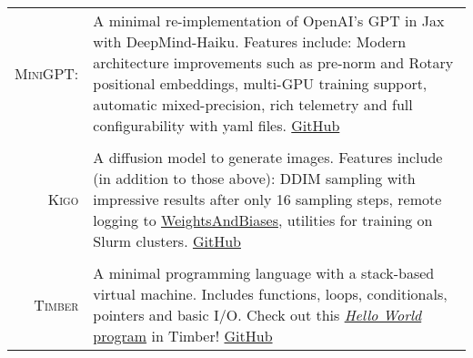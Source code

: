 \documentclass[11pt]{article}
\begin{document}
\begin{tabularx}{\textwidth}{rX}

    \textsc{MiniGPT:} & A minimal re-implementation of OpenAI's GPT in Jax with
    DeepMind-Haiku. Features include: Modern architecture improvements such as
    pre-norm and Rotary positional embeddings, multi-GPU training support,
    automatic mixed-precision, rich telemetry and full configurability with yaml files.
    \href{https://github.com/nlsfnr/MiniGPT}{GitHub} \\

    \multicolumn{2}{c}{} \\

    \textsc{Kigo} & A diffusion model to generate images. Features include (in
    addition to those above): DDIM sampling with impressive results after only
    16 sampling steps, remote logging to
    \href{https://wandb.ai}{WeightsAndBiases}, utilities for training on Slurm
    clusters. \href{https://github.com/nlsfnr/Kigo}{GitHub} \\

    \multicolumn{2}{c}{} \\

    \textsc{Timber} & A minimal programming language with a stack-based virtual
    machine. Includes functions, loops, conditionals, pointers and basic I/O.
    Check out this
    \href{https://github.com/nlsfnr/timber/blob/master/code.timber}{\textit{Hello
    World} program} in Timber! \href{https://github.com/nlsfnr/timber}{GitHub} \\

\end{tabularx}
\end{document}
